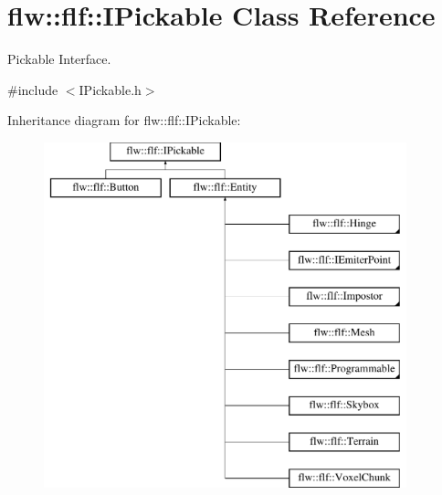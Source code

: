 \hypertarget{classflw_1_1flf_1_1IPickable}{}\section{flw\+:\+:flf\+:\+:I\+Pickable Class Reference}
\label{classflw_1_1flf_1_1IPickable}


Pickable Interface.  




{\ttfamily \#include $<$I\+Pickable.\+h$>$}

Inheritance diagram for flw\+:\+:flf\+:\+:I\+Pickable\+:\begin{figure}[H]
\begin{center}
\leavevmode
\includegraphics[height=10.000000cm]{classflw_1_1flf_1_1IPickable}
\end{center}
\end{figure}
